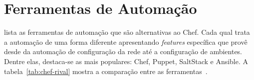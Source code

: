 \section{Ferramentas de Automação}
\label{sec:ferramenta_automacao}


 lista as ferramentas de automação que são alternativas ao
Chef. Cada qual trata a automação de uma forma diferente apresentando \textit{features} %
específica que provê desde da automação de configuração da rede até a configuração
de ambientes. Dentre elas, destaca-se as mais populares: Chef, Puppet,
SaltStack e Ansible. A tabela~\ref{tab:chef-rival} mostra a comparação entre
as ferramentas~\cite{sharma:2015}.

